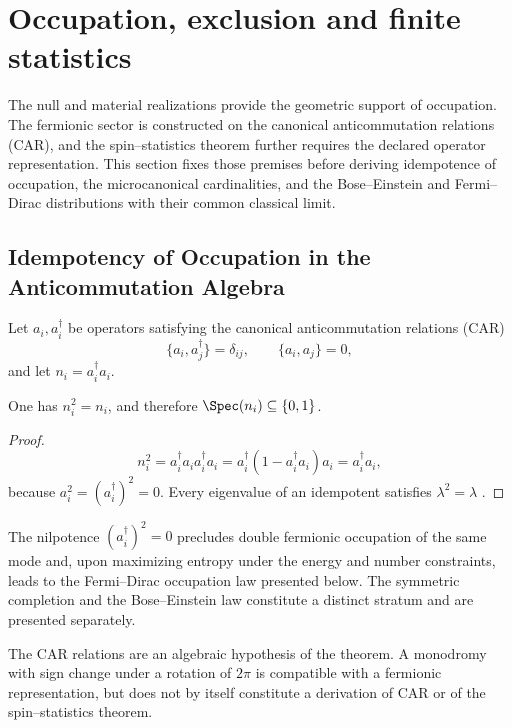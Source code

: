 \section{Occupation, exclusion and finite statistics}
\label{chap:ocupacion-estadistica}

The null and material realizations provide the geometric support of occupation. The fermionic sector is constructed on the canonical anticommutation relations (CAR), and the spin--statistics theorem further requires the declared operator representation. This section fixes those premises before deriving idempotence of occupation, the microcanonical cardinalities, and the Bose--Einstein and Fermi--Dirac distributions with their common classical limit.

\subsection{Idempotency of Occupation in the Anticommutation Algebra}

Let \(a_i,a_i^\dagger\) be operators satisfying the canonical
anticommutation relations (CAR)
\[
 \{a_i,a_j^\dagger\}=\delta_{ij},
 \qquad \{a_i,a_j\}=0,
\]
and let \(n_i=a_i^\dagger a_i\).

\begin{theorem}
\label{thm:principio-exclusion-pauli}
One has \(n_i^2=n_i\), and therefore
\(\Spec(n_i)\subseteq\{0,1\}\).
\end{theorem}
\begin{proof}
\[
 n_i^2=a_i^\dagger a_i a_i^\dagger a_i
 =a_i^\dagger(1-a_i^\dagger a_i)a_i
 =a_i^\dagger a_i,
\]
because \(a_i^2=(a_i^\dagger)^2=0\). Every eigenvalue of an idempotent
satisfies \(\lambda^2=\lambda\) \cite{Pauli1925,Dirac1926}.
\end{proof}

The nilpotence \((a_i^\dagger)^2=0\) precludes double fermionic occupation of the
same mode and, upon maximizing entropy under the energy and number
constraints, leads to the Fermi--Dirac occupation law presented below.
The symmetric completion and the Bose--Einstein law constitute a distinct
stratum and are presented separately.

The CAR relations are an algebraic hypothesis of the theorem. A monodromy
with sign change under a rotation of \(2\pi\) is compatible with a
fermionic representation, but does not by itself constitute a derivation of
CAR or of the spin--statistics theorem.
